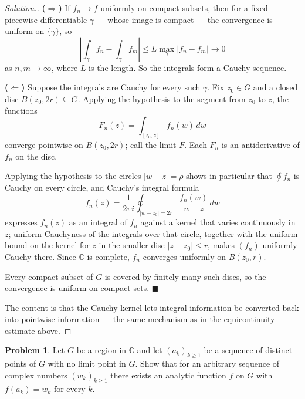 \documentclass[11pt,a4paper]{article}
\theoremstyle{definition}
\newtheorem{problemx}{Problem}[section]
\newenvironment{problem}{\begin{problemx}}{\end{problemx}}
\newenvironment{solution}
  {\renewcommand{\qedsymbol}{}\begin{proof}[\textit{Solution}.]}
  {\end{proof}}
\begin{document}
\begin{solution}
\textbf{($\Rightarrow$)} If $f_n \rightarrow f$ uniformly on compact subsets, then
for a fixed piecewise differentiable $\gamma$ --- whose image is compact --- the
convergence is uniform on $\{\gamma\}$, so
$$\left|\int_{\gamma} f_n - \int_{\gamma} f_m\right|
\leq L\max_{\gamma}\left|f_n - f_m\right| \longrightarrow 0$$
as $n,m \rightarrow \infty$, where $L$ is the length. So the integrals form a
Cauchy sequence.

\textbf{($\Leftarrow$)} Suppose the integrals are Cauchy for every such $\gamma$.
Fix $z_0 \in G$ and a closed disc $\overline{B(z_0,2r)} \subseteq G$. Applying the
hypothesis to the segment from $z_0$ to $z$, the functions
$$F_n(z) = \int_{[z_0,z]} f_n(w)\,dw$$
converge pointwise on $B(z_0,2r)$; call the limit $F$. Each $F_n$ is an
antiderivative of $f_n$ on the disc.

Applying the hypothesis to the circles $\left|w - z\right| = \rho$ shows in
particular that $\displaystyle\oint f_n$ is Cauchy on every circle, and Cauchy's
integral formula
$$f_n(z) = \frac{1}{2\pi i}\oint_{\left|w-z_0\right|=2r}\frac{f_n(w)}{w-z}\,dw$$
expresses $f_n(z)$ as an integral of $f_n$ against a kernel that varies
continuously in $z$; uniform Cauchyness of the integrals over that circle,
together with the uniform bound on the kernel for $z$ in the smaller disc
$\left|z-z_0\right| \leq r$, makes $(f_n)$ uniformly Cauchy there. Since
$\mathbb{C}$ is complete, $f_n$ converges uniformly on $\overline{B(z_0,r)}$.

Every compact subset of $G$ is covered by finitely many such discs, so the
convergence is uniform on compact sets. $\blacksquare$

The content is that the Cauchy kernel lets integral information be converted back
into pointwise information --- the same mechanism as in the equicontinuity estimate
above.
\end{solution}


\begin{problem}
Let $G$ be a region in $\mathbb{C}$ and let $(a_k)_{k \geq 1}$ be a sequence of
distinct points of $G$ with no limit point in $G$. Show that for an arbitrary
sequence of complex numbers $(w_k)_{k \geq 1}$ there exists an analytic function
$f$ on $G$ with $f(a_k) = w_k$ for every $k$.
\end{problem}
\end{document}
